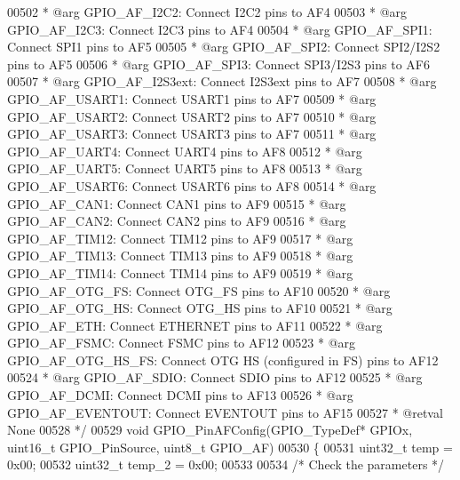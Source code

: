 \begin{DoxyCode}
00502 \textcolor{comment}{  *            @arg GPIO\_AF\_I2C2: Connect I2C2 pins to AF4}
00503 \textcolor{comment}{  *            @arg GPIO\_AF\_I2C3: Connect I2C3 pins to AF4}
00504 \textcolor{comment}{  *            @arg GPIO\_AF\_SPI1: Connect SPI1 pins to AF5}
00505 \textcolor{comment}{  *            @arg GPIO\_AF\_SPI2: Connect SPI2/I2S2 pins to AF5}
00506 \textcolor{comment}{  *            @arg GPIO\_AF\_SPI3: Connect SPI3/I2S3 pins to AF6}
00507 \textcolor{comment}{  *            @arg GPIO\_AF\_I2S3ext: Connect I2S3ext pins to AF7}
00508 \textcolor{comment}{  *            @arg GPIO\_AF\_USART1: Connect USART1 pins to AF7}
00509 \textcolor{comment}{  *            @arg GPIO\_AF\_USART2: Connect USART2 pins to AF7}
00510 \textcolor{comment}{  *            @arg GPIO\_AF\_USART3: Connect USART3 pins to AF7}
00511 \textcolor{comment}{  *            @arg GPIO\_AF\_UART4: Connect UART4 pins to AF8}
00512 \textcolor{comment}{  *            @arg GPIO\_AF\_UART5: Connect UART5 pins to AF8}
00513 \textcolor{comment}{  *            @arg GPIO\_AF\_USART6: Connect USART6 pins to AF8}
00514 \textcolor{comment}{  *            @arg GPIO\_AF\_CAN1: Connect CAN1 pins to AF9}
00515 \textcolor{comment}{  *            @arg GPIO\_AF\_CAN2: Connect CAN2 pins to AF9}
00516 \textcolor{comment}{  *            @arg GPIO\_AF\_TIM12: Connect TIM12 pins to AF9}
00517 \textcolor{comment}{  *            @arg GPIO\_AF\_TIM13: Connect TIM13 pins to AF9}
00518 \textcolor{comment}{  *            @arg GPIO\_AF\_TIM14: Connect TIM14 pins to AF9}
00519 \textcolor{comment}{  *            @arg GPIO\_AF\_OTG\_FS: Connect OTG\_FS pins to AF10}
00520 \textcolor{comment}{  *            @arg GPIO\_AF\_OTG\_HS: Connect OTG\_HS pins to AF10}
00521 \textcolor{comment}{  *            @arg GPIO\_AF\_ETH: Connect ETHERNET pins to AF11}
00522 \textcolor{comment}{  *            @arg GPIO\_AF\_FSMC: Connect FSMC pins to AF12}
00523 \textcolor{comment}{  *            @arg GPIO\_AF\_OTG\_HS\_FS: Connect OTG HS (configured in FS) pins to AF12}
00524 \textcolor{comment}{  *            @arg GPIO\_AF\_SDIO: Connect SDIO pins to AF12}
00525 \textcolor{comment}{  *            @arg GPIO\_AF\_DCMI: Connect DCMI pins to AF13}
00526 \textcolor{comment}{  *            @arg GPIO\_AF\_EVENTOUT: Connect EVENTOUT pins to AF15}
00527 \textcolor{comment}{  * @retval None}
00528 \textcolor{comment}{  */}
00529 \textcolor{keywordtype}{void} GPIO_PinAFConfig(GPIO\_TypeDef* GPIOx, uint16\_t GPIO\_PinSource, uint8\_t GPIO\_AF)
00530 \{
00531   uint32\_t temp = 0x00;
00532   uint32\_t temp\_2 = 0x00;
00533 
00534   \textcolor{comment}{/* Check the parameters */}

\end{DoxyCode}
